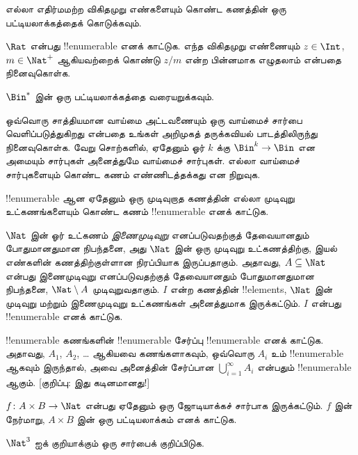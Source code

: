 \documentclass[../../../include/open-logic-section]{subfiles}
\begin{document}
\begin{prob}
எல்லா எதிர்மமற்ற விகிதமுறு எண்களையும் கொண்ட கணத்தின்
ஒரு பட்டியலாக்கத்தைக் கொடுக்கவும்.
\end{prob}

\begin{prob}
$\Rat$ என்பது !!{enumerable} எனக் காட்டுக.
எந்த விகிதமுறு எண்ணையும் $z \in \Int$, $m \in \Nat^+$ ஆகியவற்றைக் கொண்டு
$z/m$ என்ற பின்னமாக எழுதலாம் என்பதை நினைவுகொள்க.
\end{prob}

\begin{prob}
$\Bin^*$ இன் ஒரு பட்டியலாக்கத்தை வரையறுக்கவும்.
\end{prob}

\begin{prob}
ஒவ்வொரு சாத்தியமான வாய்மை அட்டவணையும் ஒரு வாய்மைச் சார்பை
வெளிப்படுத்துகிறது என்பதை உங்கள் அறிமுகத் தருக்கவியல் பாடத்திலிருந்து
நினைவுகொள்க. வேறு சொற்களில், ஏதேனும் ஓர் $k$ க்கு
$\Bin^k \to \Bin$ என அமையும் சார்புகள் அனைத்துமே வாய்மைச் சார்புகள்.
எல்லா வாய்மைச் சார்புகளையும் கொண்ட கணம் எண்ணிடத்தக்கது என நிறுவுக.
\end{prob}

\begin{prob}
!!{enumerable} ஆன ஏதேனும் ஒரு முடிவுறாத கணத்தின் எல்லா முடிவுறு
உட்கணங்களையும் கொண்ட கணம் !!{enumerable} எனக் காட்டுக.
\end{prob}

\begin{prob}
$\Nat$ இன் ஓர் உட்கணம் \emph{இணைமுடிவுறு} எனப்படுவதற்குத்
தேவையானதும் போதுமானதுமான நிபந்தனை,
அது $\Nat$ இன் ஒரு முடிவுறு உட்கணத்திற்கு, இயல் எண்களின்
கணத்திற்குள்ளான நிரப்பியாக இருப்பதாகும்.
அதாவது, $A \subseteq \Nat$ என்பது இணைமுடிவுறு எனப்படுவதற்குத்
தேவையானதும் போதுமானதுமான நிபந்தனை,
$\Nat\setminus A$ முடிவுறுவதாகும்.
$I$ என்ற கணத்தின் !!{element}s, $\Nat$ இன் முடிவுறு மற்றும்
இணைமுடிவுறு உட்கணங்கள் அனைத்துமாக இருக்கட்டும்.
$I$ என்பது !!{enumerable} எனக் காட்டுக.
\end{prob}

\begin{prob}
!!{enumerable} கணங்களின் !!{enumerable} சேர்ப்பு
!!{enumerable} எனக் காட்டுக.
அதாவது, $A_1$, $A_2$, \dots{} ஆகியவை கணங்களாகவும்,
ஒவ்வொரு $A_i$ உம் !!{enumerable} ஆகவும் இருந்தால்,
அவை அனைத்தின் சேர்ப்பான $\bigcup_{i=1}^\infty
A_i$ என்பதும் !!{enumerable} ஆகும். [குறிப்பு: இது கடினமானது!]
\end{prob}

\begin{prob}
$f \colon A \times B \to \Nat$ என்பது ஏதேனும் ஒரு ஜோடியாக்கச்
சார்பாக இருக்கட்டும். $f$ இன் நேர்மாறு,
$A \times B$ இன் ஒரு பட்டியலாக்கம் எனக் காட்டுக.
\end{prob}

\begin{prob}
$\Nat^3$ ஐக் குறியாக்கும் ஒரு சார்பைக் குறிப்பிடுக.
\end{prob}
\end{document}

